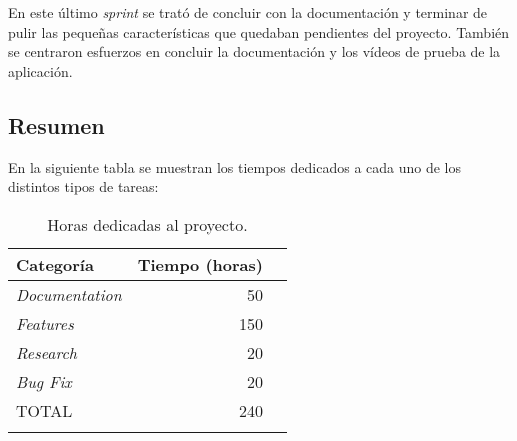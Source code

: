 En este último \emph{sprint} se trató de concluir con la documentación y terminar de pulir las pequeñas características que quedaban pendientes del proyecto. También se centraron esfuerzos en concluir la documentación y los vídeos de prueba de la aplicación.


\subsection{Resumen}

En la siguiente tabla se muestran los tiempos dedicados a cada uno de los distintos tipos de tareas:



\begin{longtable}[]{@{}lrr@{}}
\toprule
\begin{minipage}[b]{0.37\columnwidth}\raggedright\strut
Categoría\strut
\end{minipage} & \begin{minipage}[b]{0.37\columnwidth}\raggedright\strut
Tiempo (horas)\strut
\end{minipage}\tabularnewline
\midrule
\endhead
\begin{minipage}[t]{0.37\columnwidth}\raggedright\strut
\emph{Documentation}\strut
\end{minipage} & \begin{minipage}[t]{0.37\columnwidth}\raggedright\strut
50\strut
\end{minipage}\tabularnewline
\begin{minipage}[t]{0.37\columnwidth}\raggedright\strut
\emph{Features}\strut
\end{minipage} & \begin{minipage}[t]{0.37\columnwidth}\raggedright\strut
150\strut
\end{minipage}\tabularnewline
\begin{minipage}[t]{0.37\columnwidth}\raggedright\strut
\emph{Research}\strut
\end{minipage}& \begin{minipage}[t]{0.37\columnwidth}\raggedright\strut
20\strut
\end{minipage}\tabularnewline
\begin{minipage}[t]{0.37\columnwidth}\raggedright\strut
\emph{Bug Fix}\strut
\end{minipage} & \begin{minipage}[t]{0.37\columnwidth}\raggedright\strut
20\strut
\end{minipage}\tabularnewline
\midrule
\begin{minipage}[t]{0.37\columnwidth}\raggedright\strut
TOTAL\strut
\end{minipage} & \begin{minipage}[t]{0.37\columnwidth}\raggedright\strut
240\strut
\end{minipage}\tabularnewline
\bottomrule
\caption{Horas dedicadas al proyecto.}
\end{longtable}


